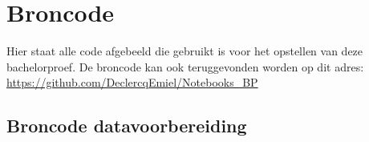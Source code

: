 \chapter{Broncode}
\label{ch:Broncode}
Hier staat alle code afgebeeld die gebruikt is voor het opstellen van deze bachelorproef.
De broncode kan ook teruggevonden worden op dit adres: \url{https://github.com/DeclercqEmiel/Notebooks_BP}

\section{Broncode datavoorbereiding}  %


